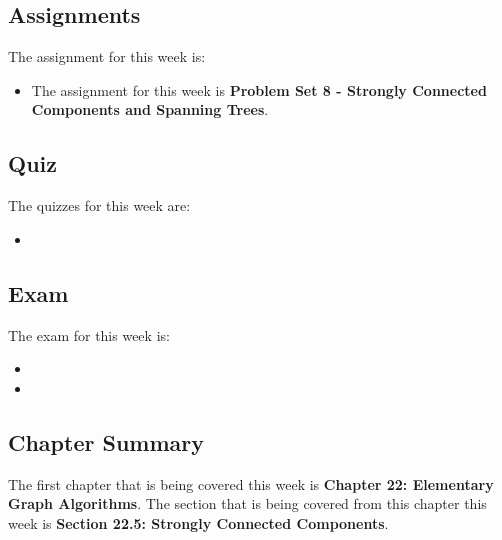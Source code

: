 \subsection{Assignments}

The assignment for this week is:

\begin{itemize}
    \item The assignment for this week is \textbf{Problem Set 8 - Strongly Connected Components and Spanning Trees}. 
\end{itemize}

\subsection{Quiz}

The quizzes for this week are:

\begin{itemize}
    \item {} \textbullet {} 
\end{itemize}

\subsection{Exam}

The exam for this week is:

\begin{itemize}
    \item {} 
    \item {} \textbullet {} 
\end{itemize}

\subsection{Chapter Summary}

The first chapter that is being covered this week is \textbf{Chapter 22: Elementary Graph Algorithms}. The section that is being covered from this chapter this week is \textbf{Section 22.5: Strongly Connected Components}.

